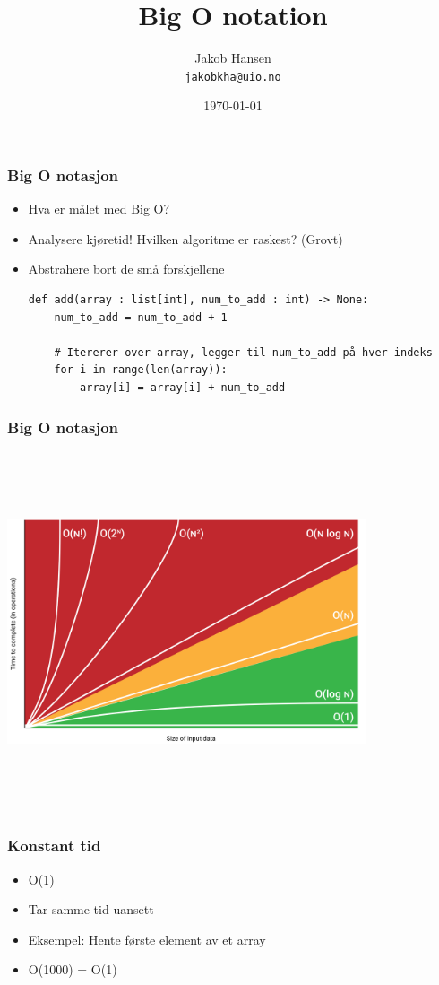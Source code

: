\documentclass[norsk]{beamer}
\title{Big O notation}
\author{Jakob Hansen \\ \texttt{jakobkha@uio.no}}
\date{\today}
\begin{document}
	\frame{\titlepage}

    \begin{frame}[fragile]
        \frametitle{Big O notasjon}
        \begin{itemize}
            \item Hva er målet med Big O?
            \pause
        \item Analysere kjøretid! Hvilken algoritme er raskest? (Grovt)
        \pause
        \item Abstrahere bort de små forskjellene
        \begin{lstlisting}[basicstyle=\scriptsize]
def add(array : list[int], num_to_add : int) -> None:
    num_to_add = num_to_add + 1

    # Itererer over array, legger til num_to_add på hver indeks
    for i in range(len(array)):
        array[i] = array[i] + num_to_add
		\end{lstlisting}
        \end{itemize}


    \end{frame}

    \begin{frame}
        \frametitle{Big O notasjon}
        \includegraphics[keepaspectratio, width=300pt, height=300pt]{big-o-chart.png}
    \end{frame}

    \begin{frame}
        \frametitle{Konstant tid}
        \begin{itemize}
            \item O(1)
            \item Tar samme tid uansett
            \item Eksempel: Hente første element av et array
            \item O(1000) = O(1)
        \end{itemize}
    \end{frame}
\end{document}
